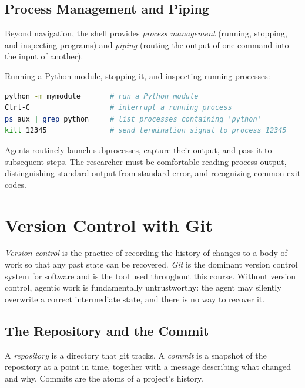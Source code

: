 \subsection{Process Management and Piping}

Beyond navigation, the shell provides \emph{process management} (running, stopping, and inspecting programs) and \emph{piping} (routing the output of one command into the input of another).

\begin{example}
Running a Python module, stopping it, and inspecting running processes:
\begin{lstlisting}[language=bash]
python -m mymodule       # run a Python module
Ctrl-C                   # interrupt a running process
ps aux | grep python     # list processes containing 'python'
kill 12345               # send termination signal to process 12345
\end{lstlisting}
\end{example}

Agents routinely launch subprocesses, capture their output, and pass it to subsequent steps.
The researcher must be comfortable reading process output, distinguishing standard output from standard error, and recognizing common exit codes.

\section{Version Control with Git}
\label{section:Git}

\emph{Version control} is the practice of recording the history of changes to a body of work so that any past state can be recovered.
\emph{Git} is the dominant version control system for software and is the tool used throughout this course.
Without version control, agentic work is fundamentally untrustworthy: the agent may silently overwrite a correct intermediate state, and there is no way to recover it.

\subsection{The Repository and the Commit}

A \emph{repository} is a directory that git tracks.
A \emph{commit} is a snapshot of the repository at a point in time, together with a message describing what changed and why.
Commits are the atoms of a project's history.

